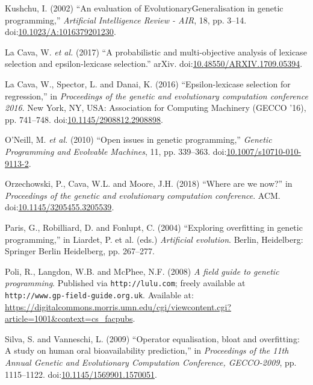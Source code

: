 \documentclass[
  12pt,
]{article}
\newlength{\cslhangindent}
\newlength{\cslentryspacingunit} %
\newenvironment{CSLReferences}[2] %
 {%
  \setlength{\parindent}{0pt}
  \ifodd #1
  \let\oldpar\par
  \def\par{\hangindent=\cslhangindent\oldpar}
  \fi
  \setlength{\parskip}{#2\cslentryspacingunit}
 }%
 {}
\begin{document}
\begin{CSLReferences}{0}{0}
\leavevmode{}%
Kushchu, I. (2002) {``An evaluation of EvolutionaryGeneralisation in
genetic programming,''} \emph{Artificial Intelligence Review - AIR}, 18,
pp. 3--14.
doi:\href{https://doi.org/10.1023/A:1016379201230}{10.1023/A:1016379201230}.

\leavevmode{}%
La Cava, W. \emph{et al.} (2017) {``A probabilistic and multi-objective
analysis of lexicase selection and epsilon-lexicase selection.''} arXiv.
doi:\href{https://doi.org/10.48550/ARXIV.1709.05394}{10.48550/ARXIV.1709.05394}.

\leavevmode{}%
La Cava, W., Spector, L. and Danai, K. (2016) {``Epsilon-lexicase
selection for regression,''} in \emph{Proceedings of the genetic and
evolutionary computation conference 2016}. New York, NY, USA:
Association for Computing Machinery (GECCO '16), pp. 741--748.
doi:\href{https://doi.org/10.1145/2908812.2908898}{10.1145/2908812.2908898}.

\leavevmode{}%
O'Neill, M. \emph{et al.} (2010) {``Open issues in genetic
programming,''} \emph{Genetic Programming and Evolvable Machines}, 11,
pp. 339--363.
doi:\href{https://doi.org/10.1007/s10710-010-9113-2}{10.1007/s10710-010-9113-2}.

\leavevmode{}%
Orzechowski, P., Cava, W.L. and Moore, J.H. (2018) {``Where are we
now?''} in \emph{Proceedings of the genetic and evolutionary computation
conference}. {ACM}.
doi:\href{https://doi.org/10.1145/3205455.3205539}{10.1145/3205455.3205539}.

\leavevmode{}%
Paris, G., Robilliard, D. and Fonlupt, C. (2004) {``Exploring
overfitting in genetic programming,''} in Liardet, P. et al. (eds.)
\emph{Artificial evolution}. Berlin, Heidelberg: Springer Berlin
Heidelberg, pp. 267--277.

\leavevmode{}%
Poli, R., Langdon, W.B. and McPhee, N.F. (2008) \emph{A field guide to
genetic programming}. Published via \texttt{http://lulu.com}; freely
available at \texttt{http://www.gp-field-guide.org.uk}. Available at:
\url{https://digitalcommons.morris.umn.edu/cgi/viewcontent.cgi?article=1001\&context=cs_facpubs}.

\leavevmode{}%
Silva, S. and Vanneschi, L. (2009) {``Operator equalisation, bloat and
overfitting: A study on human oral bioavailability prediction,''} in
\emph{Proceedings of the 11th Annual Genetic and Evolutionary
Computation Conference, GECCO-2009}, pp. 1115--1122.
doi:\href{https://doi.org/10.1145/1569901.1570051}{10.1145/1569901.1570051}.


\end{CSLReferences}
\end{document}
